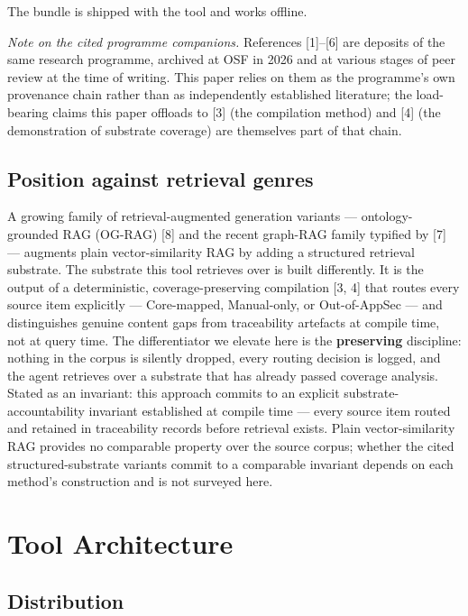 \documentclass[conference]{IEEEtran}
\begin{document}
The bundle is shipped with the tool and works offline.

\emph{Note on the cited programme companions.} References
{[}1{]}--{[}6{]} are deposits of the same research programme, archived
at OSF in 2026 and at various stages of peer review at the time of
writing. This paper relies on them as the programme's own provenance
chain rather than as independently established literature; the
load-bearing claims this paper offloads to {[}3{]} (the compilation
method) and {[}4{]} (the demonstration of substrate coverage) are
themselves part of that chain.

\subsection{Position against retrieval
genres}\label{position-against-retrieval-genres}

A growing family of retrieval-augmented generation variants ---
ontology-grounded RAG (OG-RAG) {[}8{]} and the recent graph-RAG family
typified by {[}7{]} --- augments plain vector-similarity RAG by adding a
structured retrieval substrate. The substrate this tool retrieves over
is built differently. It is the output of a deterministic,
coverage-preserving compilation {[}3, 4{]} that routes every source item
explicitly --- Core-mapped, Manual-only, or Out-of-AppSec --- and
distinguishes genuine content gaps from traceability artefacts at
compile time, not at query time. The differentiator we elevate here is
the \textbf{preserving} discipline: nothing in the corpus is silently
dropped, every routing decision is logged, and the agent retrieves over
a substrate that has already passed coverage analysis. Stated as an
invariant: this approach commits to an explicit substrate-accountability
invariant established at compile time --- every source item routed and
retained in traceability records before retrieval exists. Plain
vector-similarity RAG provides no comparable property over the source
corpus; whether the cited structured-substrate variants commit to a
comparable invariant depends on each method's construction and is not
surveyed here.

\section{Tool Architecture}\label{tool-architecture}

\subsection{Distribution}\label{distribution}
\end{document}
